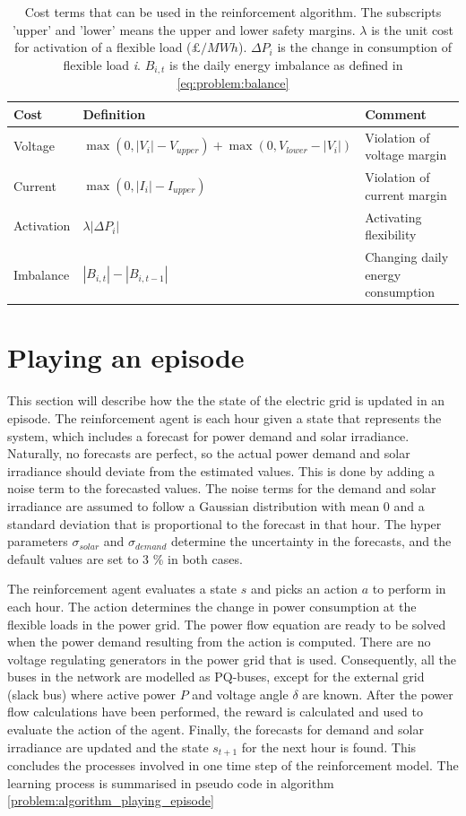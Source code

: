 \documentclass[class=book, crop=false]{standalone}
\begin{document}
\begin{table}[ht]
\centering
\caption{Cost terms that can be used in the reinforcement algorithm. The subscripts 'upper' and 'lower' means the upper and lower safety margins. $\lambda$ is the unit cost for activation of a flexible load ($\pounds/MWh$). $\Delta P_{i}$ is the change in consumption of flexible load \textit{i}. $B_{i,t}$ is the daily energy imbalance as defined in \eqref{eq:problem:balance}}
\label{table:reward_terms}
\begin{tabular}{l|ll}

Cost  & Definition & Comment
\\ 
\hline
Voltage &
$\max(0,|V_{i}| - V_{upper}) + \max(0,V_{lower}- |V_{i}|)$ &
Violation of voltage margin
\\
Current &
$\max(0,|I_{i}| - I_{upper})$&
Violation of current margin
\\
Activation &
$\lambda |\Delta P_{i}|$&
Activating flexibility
\\
Imbalance &
$|B_{i,t}|- |B_{i,t-1}|$&
Changing daily energy consumption
\\
\hline
\end{tabular}
\end{table}

\section{Playing an episode}
This section will describe how the the state of the electric grid is updated in an episode. The reinforcement agent is each hour given a state that represents the system, which includes a forecast for power demand and solar irradiance. Naturally, no forecasts are perfect, so the actual power demand and solar irradiance should deviate from the estimated values. This is done by adding a noise term to the forecasted values. The noise terms for the demand and solar irradiance are assumed to follow a Gaussian distribution with mean 0 and a standard deviation that is proportional to the forecast in that hour. The hyper parameters $\sigma_{solar}$ and $\sigma_{demand}$ determine the uncertainty in the forecasts, and the default values are set to 3 \% in both cases.



The reinforcement agent evaluates a state $s$ and picks an action $a$ to perform in each hour. The action determines the change in power consumption at the flexible loads in the power grid. The power flow equation are ready to be solved when the power demand resulting from the action is computed. There are no voltage regulating generators in the power grid that is used. Consequently, all the buses in the network are modelled as PQ-buses, except for the external grid (slack bus) where active power $P$ and voltage angle $\delta$ are known. After the power flow calculations have been performed, the reward is calculated and used to evaluate the action of the agent. Finally, the forecasts for demand and solar irradiance are updated and the state $s_{t+1}$ for the next hour is found. This concludes the processes involved in one time step of the reinforcement model. The learning process is summarised in pseudo code in algorithm \ref{problem:algorithm_playing_episode} 
\end{document}
